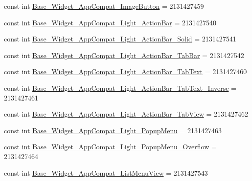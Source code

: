 \begin{DoxyCompactItemize}
\item 
const int \mbox{\hyperlink{class_f_w_p_s___app_1_1_droid_1_1_resource_1_1_style_a5812cb2b4a09ff059ed76631dd030bb0}{Base\+\_\+\+Widget\+\_\+\+App\+Compat\+\_\+\+Image\+Button}} = 2131427459
\item 
const int \mbox{\hyperlink{class_f_w_p_s___app_1_1_droid_1_1_resource_1_1_style_ab7db9c08eff881297d6134ec09b71090}{Base\+\_\+\+Widget\+\_\+\+App\+Compat\+\_\+\+Light\+\_\+\+Action\+Bar}} = 2131427540
\item 
const int \mbox{\hyperlink{class_f_w_p_s___app_1_1_droid_1_1_resource_1_1_style_ac8e0537adb230287a811e5189e10fbed}{Base\+\_\+\+Widget\+\_\+\+App\+Compat\+\_\+\+Light\+\_\+\+Action\+Bar\+\_\+\+Solid}} = 2131427541
\item 
const int \mbox{\hyperlink{class_f_w_p_s___app_1_1_droid_1_1_resource_1_1_style_ab3fa5345e503694620555973a4d42e38}{Base\+\_\+\+Widget\+\_\+\+App\+Compat\+\_\+\+Light\+\_\+\+Action\+Bar\+\_\+\+Tab\+Bar}} = 2131427542
\item 
const int \mbox{\hyperlink{class_f_w_p_s___app_1_1_droid_1_1_resource_1_1_style_a1dde9b7baf1dd7ab21ae753675e56132}{Base\+\_\+\+Widget\+\_\+\+App\+Compat\+\_\+\+Light\+\_\+\+Action\+Bar\+\_\+\+Tab\+Text}} = 2131427460
\item 
const int \mbox{\hyperlink{class_f_w_p_s___app_1_1_droid_1_1_resource_1_1_style_a1ab0fc70f786bb53eb8ea7dc0e4d930b}{Base\+\_\+\+Widget\+\_\+\+App\+Compat\+\_\+\+Light\+\_\+\+Action\+Bar\+\_\+\+Tab\+Text\+\_\+\+Inverse}} = 2131427461
\item 
const int \mbox{\hyperlink{class_f_w_p_s___app_1_1_droid_1_1_resource_1_1_style_aaf1bd90cb29e6f028ffbf3fabdd489dd}{Base\+\_\+\+Widget\+\_\+\+App\+Compat\+\_\+\+Light\+\_\+\+Action\+Bar\+\_\+\+Tab\+View}} = 2131427462
\item 
const int \mbox{\hyperlink{class_f_w_p_s___app_1_1_droid_1_1_resource_1_1_style_a3b2a682fab8d8ccf601626a1b8c22b30}{Base\+\_\+\+Widget\+\_\+\+App\+Compat\+\_\+\+Light\+\_\+\+Popup\+Menu}} = 2131427463
\item 
const int \mbox{\hyperlink{class_f_w_p_s___app_1_1_droid_1_1_resource_1_1_style_a875fabfd9ce32e0be499caeeb2055826}{Base\+\_\+\+Widget\+\_\+\+App\+Compat\+\_\+\+Light\+\_\+\+Popup\+Menu\+\_\+\+Overflow}} = 2131427464
\item 
const int \mbox{\hyperlink{class_f_w_p_s___app_1_1_droid_1_1_resource_1_1_style_acaac639983912de1ce03968c30efce92}{Base\+\_\+\+Widget\+\_\+\+App\+Compat\+\_\+\+List\+Menu\+View}} = 2131427543
\item 

\end{DoxyCompactItemize}
